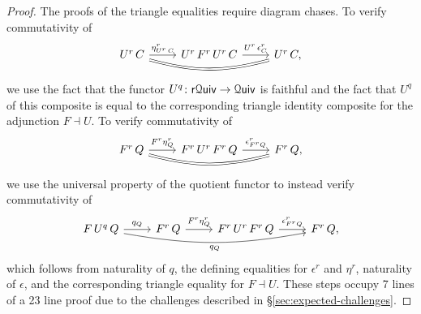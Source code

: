 \documentclass[a4paper,UKenglish,cleveref, autoref, thm-restate]{lipics-v2021}
\newcommand{\ho}{\textup{ho}}
\newcommand{\cat}[1]{\textup{\textsf{#1}}}%
\newcommand{\1}{\mathbbe{1}}
\newcommand{\2}{\mathbbe{2}}
\newcommand{\3}{\mathbbe{3}}
\newcommand{\Cat}{\mathcal{C}\cat{at}}
\newcommand{\Quiv}{\mathcal{Q}\cat{uiv}}
\newcommand{\rQuiv}{\cat{r}\mathcal{Q}\cat{uiv}}
\newcommand{\fixme}[1]{}
\begin{document}
\begin{proof}
The proofs of the triangle equalities require diagram chases. To verify commutativity of
\[ \begin{tikzcd} U^r\, C \arrow[r, "\eta^r_{U^r\,C}"] \arrow[rr, bend right=15, equals] & U^r\,F^r\,U^r\,C \arrow[r, "U^r\,\epsilon^r_C"] & U^r\,C, \end{tikzcd}\] we use the fact that the functor $U^q \colon \rQuiv \to \Quiv$ is faithful and the fact that $U^q$ of this composite is equal to the corresponding triangle identity composite for the adjunction $F \dashv U$. To verify commutativity of
\[ \begin{tikzcd} F^r\, Q \arrow[r, "F^r \eta^r_Q"] \arrow[rr, bend right=15, equals] & F^r\,U^r\,F^r\,Q \arrow[r, "\epsilon^r_{F^rQ}"] & F^r\, Q, \end{tikzcd}\] we use the universal property of the quotient functor to instead verify commutativity of
\[ \begin{tikzcd} F\,U^q\, Q \arrow[r, "q_Q"] \arrow[rrr, bend right=10, "q_Q"'] & F^r\, Q \arrow[r, "F^r \eta^r_Q"] & F^r\,U^r\,F^r\,Q \arrow[r, "\epsilon^r_{F^rQ}"] & F^r\, Q, \end{tikzcd}\] which follows from naturality of $q$, the defining equalities for $\epsilon^r$ and $\eta^r$, naturality of $\epsilon$, and the corresponding triangle equality for $F \dashv U$. These steps occupy 7 lines of a 23 line proof due to the challenges described in \S\ref{sec:expected-challenges}.
\end{proof}

\end{document}
